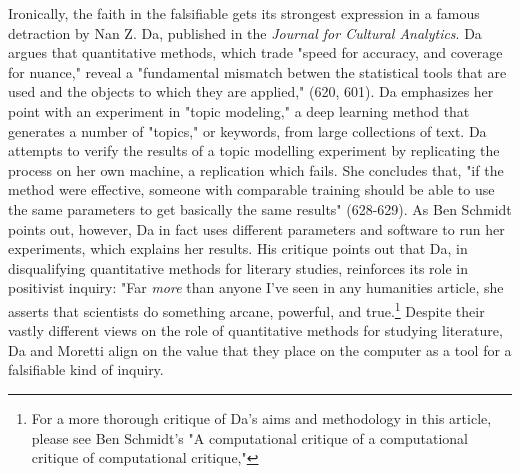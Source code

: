 \documentclass[11pt]{article}
\begin{document}
Ironically, the faith in the falsifiable gets its strongest expression
in a famous detraction by Nan Z. Da, published in the \emph{Journal for
Cultural Analytics}. Da argues that quantitative methods, which trade
"speed for accuracy, and coverage for nuance," reveal a "fundamental
mismatch betwen the statistical tools that are used and the objects to
which they are applied," (620, 601). Da emphasizes her point with an
experiment in "topic modeling," a deep learning method that generates
a number of "topics," or keywords, from large collections of text. Da
attempts to verify the results of a topic modelling experiment by
replicating the process on her own machine, a replication which
fails. She concludes that, "if the method were effective, someone with
comparable training should be able to use the same parameters to get
basically the same results" (628-629). As Ben Schmidt points out,
however, Da in fact uses different parameters and software to run her
experiments, which explains her results. His critique points out that
Da, in disqualifying quantitative methods for literary studies,
reinforces its role in positivist inquiry: "Far \emph{more} than anyone
I’ve seen in any humanities article, she asserts that scientists do
something arcane, powerful, and true.\footnote{For a more thorough critique of Da's aims and methodology in
this article, please see Ben Schmidt's "A computational critique of a
computational critique of computational critique,"} Despite their vastly
different views on the role of quantitative methods for studying
literature, Da and Moretti align on the value that they place on the
computer as a tool for a falsifiable kind of inquiry.
\end{document}
